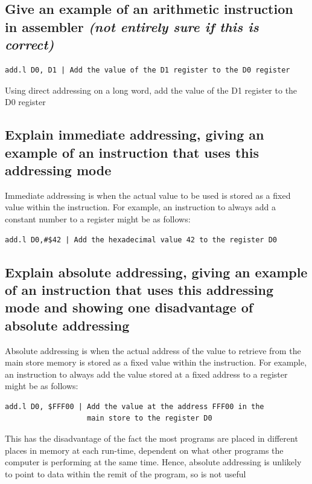 \documentclass{article}
\begin{document}
\subsection{Give an example of an arithmetic instruction in assembler
\emph{(not entirely sure if this is correct)}}
\begin{verbatim}
add.l D0, D1 | Add the value of the D1 register to the D0 register
\end{verbatim}
Using direct addressing on a long word, add the value of the D1 register
to the D0 register



\subsection{Explain immediate addressing, giving an example of an
instruction that uses this addressing mode}

Immediate addressing is when the actual value to be used is stored as a
fixed value within the instruction. For example, an instruction to
always add a constant number to a register might be as follows:

\begin{verbatim}
add.l D0,#$42 | Add the hexadecimal value 42 to the register D0
\end{verbatim}



\subsection{Explain absolute addressing, giving an example of an
instruction that uses this addressing mode and showing one disadvantage
of absolute addressing}

Absolute addressing is when the actual address of the value to retrieve
from the main store memory is stored as a fixed value within the
instruction. For example, an instruction to always add the value stored
at a fixed address to a register might be as follows:

\begin{verbatim}
add.l D0, $FFF00 | Add the value at the address FFF00 in the
                   main store to the register D0
\end{verbatim}

This has the disadvantage of the fact the most programs are placed in
different places in memory at each run-time, dependent on what other
programs the computer is performing at the same time. Hence, absolute
addressing is unlikely to point to data within the remit of the program,
so is not useful
\end{document}

